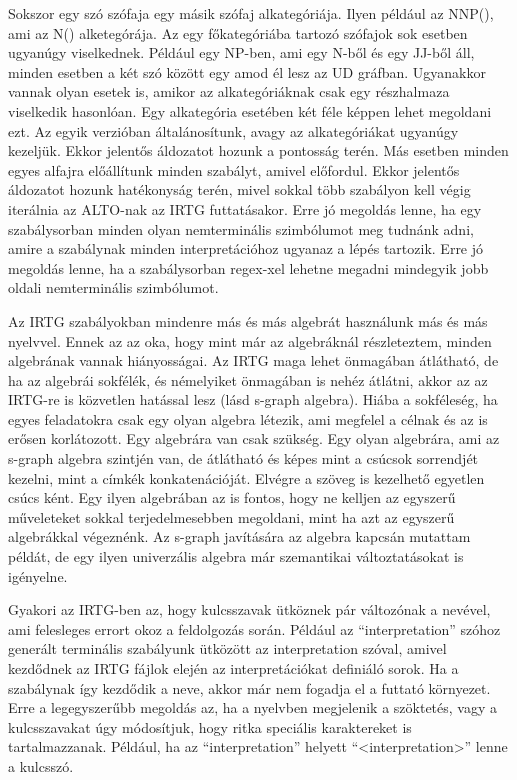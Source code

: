 Sokszor egy szó szófaja egy másik szófaj alkategóriája. Ilyen például az NNP(), ami az N() alketegórája. Az egy főkategóriába tartozó szófajok sok esetben ugyanúgy viselkednek. Például egy NP-ben, ami egy N-ből és egy JJ-ből áll, minden esetben a két szó között egy amod él lesz az UD gráfban. Ugyanakkor vannak olyan esetek is, amikor az alkategóriáknak csak egy részhalmaza viselkedik hasonlóan. Egy alkategória esetében két féle képpen lehet megoldani ezt. Az egyik verzióban általánosítunk, avagy az alkategóriákat ugyanúgy kezeljük. Ekkor jelentős áldozatot hozunk a pontosság terén. Más esetben minden egyes alfajra előállítunk minden szabályt, amivel előfordul. Ekkor jelentős áldozatot hozunk hatékonyság terén, mivel sokkal több szabályon kell végig iterálnia az ALTO-nak az IRTG futtatásakor. Erre jó megoldás lenne, ha egy szabálysorban minden olyan nemterminális szimbólumot meg tudnánk adni, amire a szabálynak minden interpretációhoz ugyanaz a lépés tartozik. Erre jó megoldás lenne, ha a szabálysorban regex-xel lehetne megadni mindegyik jobb oldali nemterminális szimbólumot.


Az IRTG szabályokban mindenre más és más algebrát használunk más és más nyelvvel. Ennek az az oka, hogy mint már az algebráknál részleteztem, minden algebrának vannak hiányosságai. Az IRTG maga lehet önmagában átlátható, de ha az algebrái sokfélék, és némelyiket önmagában is nehéz átlátni, akkor az az IRTG-re is közvetlen hatással lesz (lásd s-graph algebra). Hiába a sokféleség, ha egyes feladatokra csak egy olyan algebra létezik, ami megfelel a célnak és az is erősen korlátozott. Egy algebrára van csak szükség. Egy olyan algebrára, ami az s-graph algebra szintjén van, de átlátható és képes mint a csúcsok sorrendjét kezelni, mint a címkék konkatenációját. Elvégre a szöveg is kezelhető egyetlen csúcs ként. Egy ilyen algebrában az is fontos, hogy ne kelljen az egyszerű műveleteket sokkal terjedelmesebben megoldani, mint ha azt az egyszerű algebrákkal végeznénk. Az s-graph javítására az algebra kapcsán mutattam példát, de egy ilyen univerzális algebra már szemantikai változtatásokat is igényelne.


Gyakori az IRTG-ben az, hogy kulcsszavak ütköznek pár változónak a nevével, ami felesleges errort okoz a feldolgozás során. Például az “interpretation” szóhoz generált terminális szabályunk ütközött az interpretation szóval, amivel kezdődnek az IRTG fájlok elején az interpretációkat definiáló sorok. Ha a szabálynak így kezdődik a neve, akkor már nem fogadja el a futtató környezet. Erre a legegyszerűbb megoldás az, ha a nyelvben megjelenik a szöktetés, vagy a kulcsszavakat úgy módosítjuk, hogy ritka speciális karaktereket is tartalmazzanak. Például, ha az “interpretation” helyett “<interpretation>” lenne a kulcsszó.


